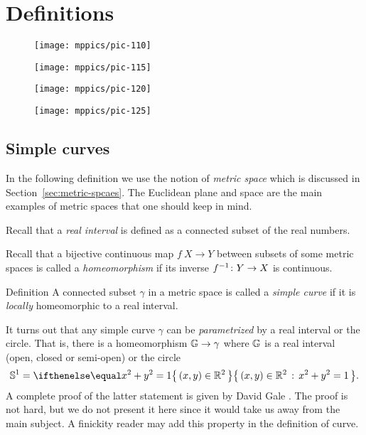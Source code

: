 \chapter{Definitions}


\begin{figure}[h!]
\begin{minipage}{.48\textwidth}
\centering
\texttt{[image: mppics/pic-110]}
\end{minipage}\hfill
\begin{minipage}{.48\textwidth}
\centering
\texttt{[image: mppics/pic-115]}
\end{minipage}
\bigskip
\begin{minipage}{.48\textwidth}
\centering
\texttt{[image: mppics/pic-120]}
\end{minipage}\hfill
\begin{minipage}{.48\textwidth}
\centering
\texttt{[image: mppics/pic-125]}
\end{minipage}
\end{figure}

\section{Simple curves}

In the following definition we use the notion of {}\emph{metric space} which is discussed in Section~\ref{sec:metric-spcaes}.
The Euclidean plane and space are the main examples of metric spaces that one should keep in mind.

Recall that a \emph{real interval} is defined as a connected subset of the real numbers.

Recall that a bijective continuous map $f\:X\to Y$ between subsets of some metric spaces is called a {}\emph{homeomorphism} if its inverse $f^{-1}\:Y\z\to X$ is continuous.  

\begin{thm}{Definition} 
A connected subset $\gamma$ in a metric space is called a \emph{simple curve} if it is {}\emph{locally} homeomorphic to a real interval.
\end{thm}

It turns out that any simple curve $\gamma$ can be \emph{parametrized} by a real interval or the circle.
That is, there is a homeomorphism $\mathbb{G}\to\gamma$ 
where $\mathbb{G}$ is a real interval (open, closed or semi-open) or the circle
\[\mathbb{S}^1=\set{(x,y)\in\RR^2}{x^2+y^2=1}.\] 
A complete proof of the latter statement is given by David Gale \cite{gale}.
The proof is not hard, but we do not present it here since it would take us away from the main subject.
A finickity reader may add this property in the definition of curve.

